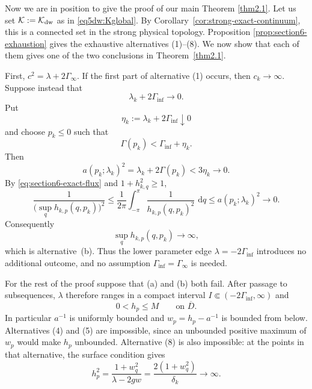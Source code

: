 \documentclass[11pt,reqno]{amsart}
\numberwithin{equation}{section}
\newcommand{\dd}{\,\mathrm{d}}
\theoremstyle{definition}
\theoremstyle{remark}
\begin{document}
Now we are in position to give the proof of our main Theorem
\ref{thm2.1}. Let us set
$\mathcal{K}:=\mathcal K_{\rm dw}$ as in \eqref{eq5dw:Kglobal}.
By Corollary~\ref{cor:strong-exact-continuum}, this is a connected
set in the strong physical topology.  Proposition
\ref{prop:section6-exhaustion} gives the exhaustive alternatives
\textup{(1)}--\textup{(8)}.  We now show that each of them gives one
of the two conclusions in Theorem~\ref{thm2.1}.

First,
$c^2=\lambda+2\Gamma_\infty$.  If the first part of alternative
\textup{(1)} occurs, then $c_k\to\infty$.  Suppose instead that
\[
 \lambda_k+2\Gamma_{\inf}\longrightarrow0.
\]
Put
\[
 \eta_k:=\lambda_k+2\Gamma_{\inf}\downarrow0
\]
and choose $p_k\le0$ such that
\[
 \Gamma(p_k)<\Gamma_{\inf}+\eta_k.
\]
Then
\[
 a(p_k;\lambda_k)^2
 =\lambda_k+2\Gamma(p_k)
 <3\eta_k\longrightarrow0.
\]
By \eqref{eq:section6-exact-flux} and $1+h_{k,q}^2\ge1$,
\[
 \frac{1}{\bigl(\sup_q h_{k,p}(q,p_k)\bigr)^2}
 \le
 \frac1{2\pi}\int_{-\pi}^{\pi}
 \frac{1}{h_{k,p}(q,p_k)^2}\,\dd q
 \le a(p_k;\lambda_k)^2\longrightarrow0.
\]
Consequently
\[
 \sup_q h_{k,p}(q,p_k)\longrightarrow\infty,
\]
which is alternative~\textup{(b)}.  Thus the lower parameter edge
$\lambda=-2\Gamma_{\inf}$ introduces no additional outcome, and no
assumption $\Gamma_{\inf}=\Gamma_\infty$ is needed.

For the rest of the proof suppose that \textup{(a)} and
\textup{(b)} both fail.  After passage to subsequences, $\lambda$
therefore ranges in a compact interval
$I\Subset(-2\Gamma_{\inf},\infty)$ and
\begin{equation}\label{eq:section6-hp-upper}
 0<h_p\le M\qquad\text{on }\overline D.
\end{equation}
In particular $a^{-1}$ is uniformly bounded and
$w_p=h_p-a^{-1}$ is bounded from below.  Alternatives
\textup{(4)} and \textup{(5)} are impossible, since an unbounded
positive maximum of $w_p$ would make $h_p$ unbounded.  Alternative
\textup{(8)} is also impossible: at the points in that alternative,
the surface condition gives
\[
 h_p^2=\frac{1+w_q^2}{\lambda-2gw}
 =\frac{2(1+w_q^2)}{\delta_k}\longrightarrow\infty.
\]
\end{document}
